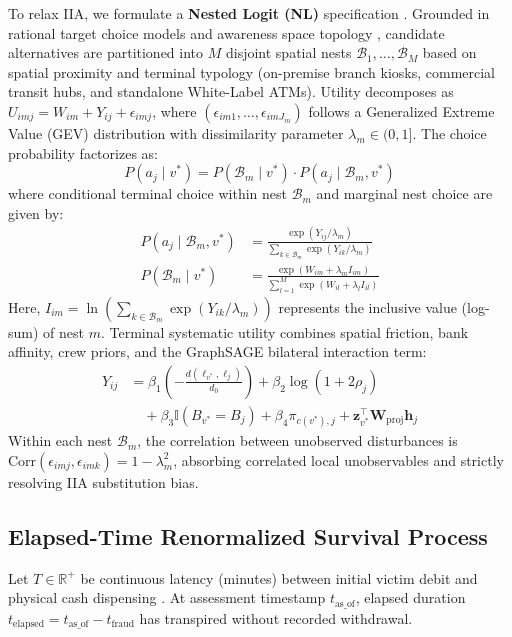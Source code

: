 \documentclass[conference]{IEEEtran}
\begin{document}
To relax IIA, we formulate a \textbf{Nested Logit (NL)} specification \cite{train2009}. Grounded in rational target choice models \cite{bernasco2005} and awareness space topology \cite{brantingham1993}, candidate alternatives are partitioned into $M$ disjoint spatial nests $\mathcal{B}_1, \dots, \mathcal{B}_M$ based on spatial proximity and terminal typology (on-premise branch kiosks, commercial transit hubs, and standalone White-Label ATMs). Utility decomposes as $U_{imj} = W_{im} + Y_{ij} + \epsilon_{imj}$, where $(\epsilon_{im1}, \dots, \epsilon_{imJ_m})$ follows a Generalized Extreme Value (GEV) distribution with dissimilarity parameter $\lambda_m \in (0, 1]$. The choice probability factorizes as:
\begin{equation}
P(a_j \mid v^*) = P(\mathcal{B}_m \mid v^*) \cdot P(a_j \mid \mathcal{B}_m, v^*)
\end{equation}
where conditional terminal choice within nest $\mathcal{B}_m$ and marginal nest choice are given by:
\begin{align}
P(a_j \mid \mathcal{B}_m, v^*) &= \frac{\exp\left( Y_{ij} / \lambda_m \right)}{\sum_{k \in \mathcal{B}_m} \exp\left( Y_{ik} / \lambda_m \right)} \\
P(\mathcal{B}_m \mid v^*) &= \frac{\exp\left( W_{im} + \lambda_m I_{im} \right)}{\sum_{l=1}^M \exp\left( W_{il} + \lambda_l I_{il} \right)}
\end{align}
Here, $I_{im} = \ln \left( \sum_{k \in \mathcal{B}_m} \exp(Y_{ik} / \lambda_m) \right)$ represents the inclusive value (log-sum) of nest $m$. Terminal systematic utility combines spatial friction, bank affinity, crew priors, and the GraphSAGE bilateral interaction term:
\begin{align}
Y_{ij} &= \beta_1 \left(-\frac{d(\ell_{v^*}, \ell_j)}{d_0}\right) + \beta_2 \log(1 + 2\rho_j) \nonumber \\
&\quad + \beta_3 \mathbb{I}(B_{v^*} = B_j) + \beta_4 \pi_{c(v^*), j} + \mathbf{z}_{v^*}^\top \mathbf{W}_{\text{proj}} \mathbf{h}_j
\end{align}
Within each nest $\mathcal{B}_m$, the correlation between unobserved disturbances is $\text{Corr}(\epsilon_{imj}, \epsilon_{imk}) = 1 - \lambda_m^2$, absorbing correlated local unobservables and strictly resolving IIA substitution bias.

\subsection{Elapsed-Time Renormalized Survival Process}
Let $T \in \mathbb{R}^+$ be continuous latency (minutes) between initial victim debit and physical cash dispensing \cite{cox1972, aalen2008}. At assessment timestamp $t_{\text{as\_of}}$, elapsed duration $t_{\text{elapsed}} = t_{\text{as\_of}} - t_{\text{fraud}}$ has transpired without recorded withdrawal. 
\end{document}
